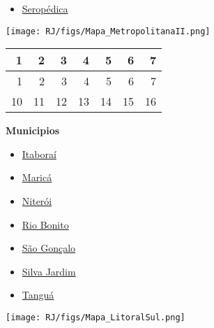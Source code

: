 \documentclass[10pt]{article} %
\begin{document}
\begin{minipage}[t]{.30\linewidth}
\begin{mdframed}[style=sidebar,frametitle={}]
\begin{itemize}
\item \hyperlink{https:/alerta.dengue.mat.br/alerta/3305554}{Seropédica}
\end{itemize}\end{mdframed}\hfill\end{minipage}\newpage\begin{minipage}[t]{.66\linewidth}
\hypertarget{ MtII }{}
\texttt{[image: RJ/figs/Mapa\_MetropolitanaII.png]}\vspace{0.5cm}\begin{center}
\begin{tabular}{rrrrrrr}
  \hline
1 & 2 & 3 & 4 & 5 & 6 & 7 \\ 
  \hline
  1 &   2 &   3 &   4 &   5 &   6 &   7 \\ 
   10 &  11 &  12 &  13 &  14 &  15 &  16 \\ 
   \hline
\end{tabular}
\end{center}
\end{minipage}\hfill\begin{minipage}[t]{.30\linewidth}
\begin{mdframed}[style=sidebar,frametitle={}]
\textbf{Municipios}\begin{itemize}\item \hyperlink{https:/alerta.dengue.mat.br/alerta/3301900}{Itaboraí}
\item \hyperlink{https:/alerta.dengue.mat.br/alerta/3302700}{Maricá}
\item \hyperlink{https:/alerta.dengue.mat.br/alerta/3303302}{Niterói}
\item \hyperlink{https:/alerta.dengue.mat.br/alerta/3304300}{Rio Bonito}
\item \hyperlink{https:/alerta.dengue.mat.br/alerta/3304904}{São Gonçalo}
\item \hyperlink{https:/alerta.dengue.mat.br/alerta/3305604}{Silva Jardim}
\item \hyperlink{https:/alerta.dengue.mat.br/alerta/3305752}{Tanguá}
\end{itemize}\end{mdframed}\hfill\end{minipage}\newpage\begin{minipage}[t]{.66\linewidth}
\hypertarget{ LtrS }{}
\texttt{[image: RJ/figs/Mapa\_LitoralSul.png]}\vspace{0.5cm}\begin{center}

\end{center}
\end{minipage}
\end{document}
